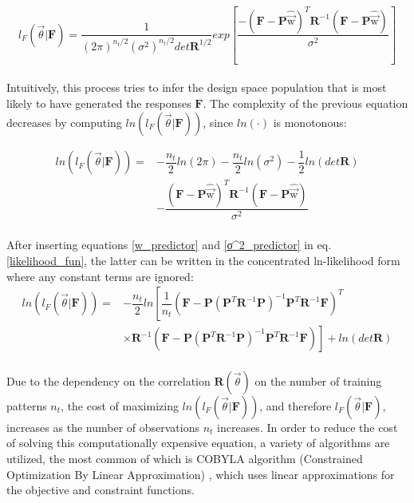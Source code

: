 \begin{equation}
l_{F}(\vec{θ} | \mathbf{F}) = 
\dfrac{1}{(2π)^{n_{t}/2} (σ^2)^{n_{t}/2} det\mathbf{R}^{1/2} }
exp \left[ \dfrac{-( \mathbf{F} - \mathbf{P}\hat{\vec{\mathrm{w}}} 
)^{T} 
\mathbf{R}^{-1} ( \mathbf{F} - \mathbf{P}
\hat{\vec{\mathrm{w}}} )}{σ^2} \right]
\end{equation}
\\
Intuitively, this process tries to infer the design space 
population that is most likely to have generated the responses 
$\mathbf{F}$. The complexity of the previous equation decreases by 
computing $ln(l_{F}(\vec{θ} | \mathbf{F}))$, since $ln(\cdot)$ is 
monotonous: 

\begin{equation}\label{likelihood_fun}
\begin{split}
ln(l_{F}(\vec{θ} | \mathbf{F})) = & - \dfrac{n_{t}}{2}ln(2π) 
- \dfrac{n_{t}}{2}ln(σ^2) - \dfrac{1}{2}ln(det\mathbf{R}) 
\\ &
- \dfrac{ ( \mathbf{F} -\mathbf{P}\hat{\vec{\mathrm{w}}} )^{T} 
\mathbf{R}^{-1} ( \mathbf{F} - \mathbf{P}
\hat{\vec{\mathrm{w}}} ) }{σ^2}
\end{split}
\end{equation}
\\
After inserting equations \ref{w_predictor} and 
\ref{σ^2_predictor} in eq. \ref{likelihood_fun}, the latter 
can be written in the concentrated ln-likelihood form where any 
constant terms are ignored:
\begin{equation}\label{max_likelihood_fun}
\begin{split}
ln(l_{F}(\vec{θ} | \mathbf{F})) = & 
-\dfrac{n_{t}}{2} ln \left[
\dfrac{1}{n_{t}} \left( \mathbf{F} - \mathbf{P} (\mathbf{P}^{T} 
\mathbf{R}^{-1}\mathbf{P})^{-1} 
\mathbf{P}^{T}\mathbf{R}^{-1}\mathbf{F} \right)^{T}
\right.
\\ & \times \left.  
\mathbf{R}^{-1} \left( \mathbf{F} - \mathbf{P} 
\left(\mathbf{P}^{T} \mathbf{R}^{-1}\mathbf{P}
\right)^{-1} \mathbf{P}^{T}\mathbf{R}^{-1}\mathbf{F}
\right) \right] + ln(det\mathbf{R} )
\end{split}	
\end{equation}
\\
Due to the dependency on the correlation $\mathbf{R}(\vec{θ})$ on 
the number of training patterns $n_{t}$, the cost of maximizing
$ln(l_{F}(\vec{θ} | \mathbf{F}))$, and therefore $l_{F}(\vec{θ} |
\mathbf{F})$, increases as the number of observations $n_{t}$ 
increases. In order to reduce the cost of solving this 
computationally expensive equation, a variety of algorithms are 
utilized, the most common of which is COBYLA algorithm (Constrained 
Optimization By Linear Approximation) \cite{COBYLA}, which uses 
linear approximations for the objective and constraint functions.



